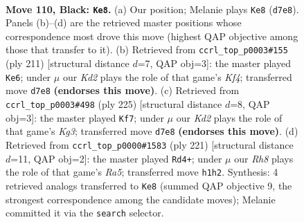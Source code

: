 \documentclass[11pt]{article}
\begin{document}
\clearpage

\begin{figure}[p]\centering
\begin{subfigure}{0.46\textwidth}\centering
\resizebox{\linewidth}{!}{%
\newchessgame
\chessboard[
  setfen={8/3k4/4p3/4P3/5PR1/8/R4K2/7r b - - 6 110},
  showmover=false,
  pgfstyle=straightmove, color=movearrow, markmove={d7-e8}
]}
\caption{}
\end{subfigure}\hfill
\begin{subfigure}{0.46\textwidth}\centering
\resizebox{\linewidth}{!}{%
\newchessgame
\chessboard[
  setfen={7R/8/8/5k2/5p2/5P2/6PK/1r6 b - - 20 106},
  showmover=false,
  pgfstyle=straightmove, color=movearrow, markmove={f5-e6}
]}
\caption{}
\end{subfigure}
\\[4pt]
\begin{subfigure}{0.46\textwidth}\centering
\resizebox{\linewidth}{!}{%
\newchessgame
\chessboard[
  setfen={8/8/6k1/6p1/6P1/1R3K1P/8/r7 b - - 65 113},
  showmover=false,
  pgfstyle=straightmove, color=movearrow, markmove={g6-f7}
]}
\caption{}
\end{subfigure}\hfill
\begin{subfigure}{0.46\textwidth}\centering
\resizebox{\linewidth}{!}{%
\newchessgame
\chessboard[
  setfen={8/5R2/8/4k3/r5p1/6P1/3K1P2/8 b - - 24 111},
  showmover=false,
  pgfstyle=straightmove, color=movearrow, markmove={a4-d4}
]}
\caption{}
\end{subfigure}
\caption{\textbf{Move 110, Black: \texttt{Ke8}.} (a) Our position; Melanie plays \texttt{Ke8} (\texttt{d7e8}). Panels (b)--(d) are the retrieved master positions whose correspondence most drove this move (highest QAP objective among those that transfer to it). (b) Retrieved from \texttt{ccrl\_top\_p0003\#155} (ply 211) [structural distance $d$=7, QAP obj=3]: the master played \texttt{Ke6}; under $\mu$ our \emph{Kd2} plays the role of that game's \emph{Kf4}; transferred move \texttt{d7e8} \textbf{(endorses this move)}. (c) Retrieved from \texttt{ccrl\_top\_p0003\#498} (ply 225) [structural distance $d$=8, QAP obj=3]: the master played \texttt{Kf7}; under $\mu$ our \emph{Kd2} plays the role of that game's \emph{Kg3}; transferred move \texttt{d7e8} \textbf{(endorses this move)}. (d) Retrieved from \texttt{ccrl\_top\_p0000\#1583} (ply 221) [structural distance $d$=11, QAP obj=2]: the master played \texttt{Rd4+}; under $\mu$ our \emph{Rh8} plays the role of that game's \emph{Ra5}; transferred move \texttt{h1h2}. Synthesis: 4 retrieved analogs transferred to \texttt{Ke8} (summed QAP objective 9, the strongest correspondence among the candidate moves); Melanie committed it via the \texttt{search} selector.}
\label{fig:thought-m219}
\end{figure}
\end{document}

